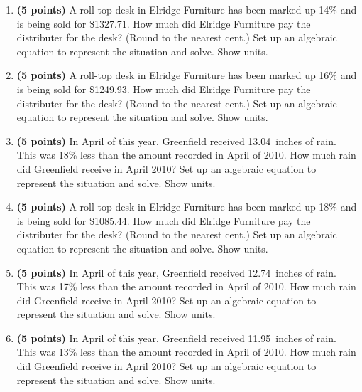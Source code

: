 \documentclass[12pt]{amsart}
\begin{document}
\begin{enumerate}
\vfill 
\def \discount{14}\def \paid{1327.71}\def \rainy{15.08}\def \orcost{1543.85}\def \purcost{1164.66}\def \orrainy{17.53}
\item {\bf (5 points)} 
 A roll-top desk in Elridge Furniture has been marked up \discount\% and is being sold for \$\paid. How much did Elridge Furniture pay the distributer for the desk? (Round to the nearest cent.) Set up an algebraic equation to represent the situation and solve. Show units.

\vfill 
\def \discount{16}\def \paid{1249.93}\def \rainy{12.89}\def \orcost{1488.01}\def \purcost{1077.53}\def \orrainy{15.35}
\item {\bf (5 points)} 
 A roll-top desk in Elridge Furniture has been marked up \discount\% and is being sold for \$\paid. How much did Elridge Furniture pay the distributer for the desk? (Round to the nearest cent.) Set up an algebraic equation to represent the situation and solve. Show units.

\vfill 
\def \discount{18}\def \paid{1675.06}\def \rainy{13.04}\def \orcost{2042.76}\def \purcost{1419.54}\def \orrainy{15.90}
\item {\bf (5 points)} 
 In April of this year, Greenfield received \rainy\ inches of rain. This was \discount\% less than the amount recorded in April of 2010. How much rain did Greenfield  receive in April 2010? Set up an algebraic equation to represent the situation and solve. Show units.

\vfill 
\def \discount{18}\def \paid{1085.44}\def \rainy{13.92}\def \orcost{1323.71}\def \purcost{919.86}\def \orrainy{16.98}
\item {\bf (5 points)} 
 A roll-top desk in Elridge Furniture has been marked up \discount\% and is being sold for \$\paid. How much did Elridge Furniture pay the distributer for the desk? (Round to the nearest cent.) Set up an algebraic equation to represent the situation and solve. Show units.

\vfill 
\def \discount{17}\def \paid{1408.47}\def \rainy{12.74}\def \orcost{1696.95}\def \purcost{1203.82}\def \orrainy{15.35}
\item {\bf (5 points)} 
 In April of this year, Greenfield received \rainy\ inches of rain. This was \discount\% less than the amount recorded in April of 2010. How much rain did Greenfield  receive in April 2010? Set up an algebraic equation to represent the situation and solve. Show units.

\vfill 
\def \discount{13}\def \paid{1149.37}\def \rainy{11.95}\def \orcost{1321.11}\def \purcost{1017.14}\def \orrainy{13.74}
\item {\bf (5 points)} 
 In April of this year, Greenfield received \rainy\ inches of rain. This was \discount\% less than the amount recorded in April of 2010. How much rain did Greenfield  receive in April 2010? Set up an algebraic equation to represent the situation and solve. Show units.


\end{enumerate}
\end{document}
